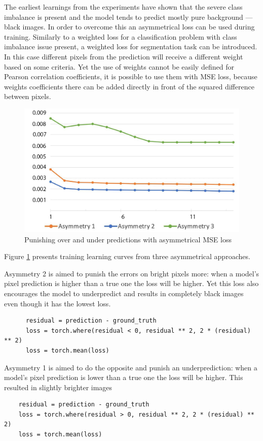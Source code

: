 The earliest learnings from the experiments have shown that the severe class imbalance is present and the model tends to predict mostly pure background --- black images. In order to overcome this an asymmetrical loss can be used during training. Similarly to a weighted loss for a classification problem with class imbalance issue present, a weighted loss for segmentation task can be introduced. In this case different pixels from the prediction will receive a different weight based on some criteria. Yet the use of weights cannot be easily defined for Pearson correlation coefficients, it is possible to use them with MSE loss, because weights coefficients there can be added directly in front of the squared difference between pixels. 
\begin{figure}[H]
	\begin{center}
		\includegraphics[width=0.5\linewidth]{bilder/golgi/asymmetrical-training.png}
		\caption{Punishing over and under predictions with asymmetrical MSE loss}\label{fig:golgi-asymmetrical-training}
	\end{center}
\end{figure}

Figure \ref{fig:golgi-asymmetrical-training} presents training learning curves from three asymmetrical approaches.

Asymmetry 2 is aimed to punish the errors on bright pixels more: when a model's pixel prediction is higher than a true one the loss will be higher. Yet this loss also encourages the model to underpredict and results in completely black images even though it has the lowest loss.
  \begin{lstlisting}
	  residual = prediction - ground_truth
	  loss = torch.where(residual < 0, residual ** 2, 2 * (residual) ** 2)
	  loss = torch.mean(loss)
	\end{lstlisting}

Asymmetry 1 is aimed to do the opposite and punish an underprediction: when a model's pixel prediction is lower than a true one the loss will be higher. This resulted in slightly brighter images
\begin{lstlisting}
	residual = prediction - ground_truth
	loss = torch.where(residual > 0, residual ** 2, 2 * (residual) ** 2)
	loss = torch.mean(loss)
  \end{lstlisting}

